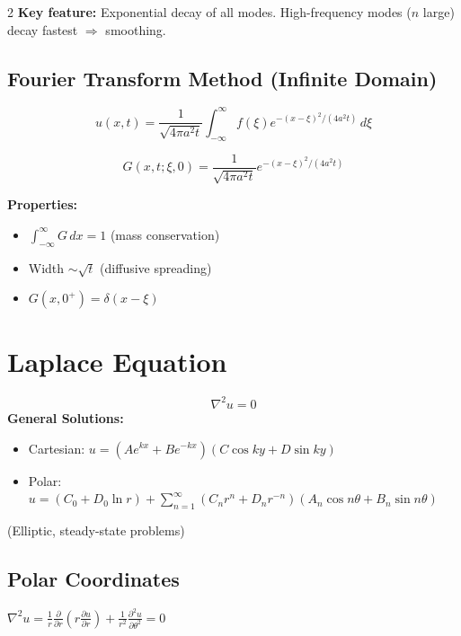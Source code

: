 \documentclass[10pt,a4paper]{article}
\begin{document}
\begin{multicols}{2}
\textbf{Key feature:} Exponential decay of all modes. High-frequency modes ($n$ large) decay fastest $\Rightarrow$ smoothing.

\subsection{Fourier Transform Method (Infinite Domain)}
\begin{equation}
u(x,t) = \frac{1}{\sqrt{4\pi a^2 t}}\int_{-\infty}^{\infty} f(\xi)e^{-(x-\xi)^2/(4a^2 t)}\,d\xi
\end{equation}

\begin{keyformula}
\begin{equation}
G(x,t;\xi,0) = \frac{1}{\sqrt{4\pi a^2 t}}e^{-(x-\xi)^2/(4a^2 t)}
\end{equation}
\end{keyformula}

\textbf{Properties:}
\begin{itemize}
    \item $\int_{-\infty}^{\infty} G\,dx = 1$ (mass conservation)
    \item Width $\sim \sqrt{t}$ (diffusive spreading)
    \item $G(x,0^+) = \delta(x-\xi)$
\end{itemize}

\section{Laplace Equation}

\begin{keyformula}
\begin{equation}
\nabla^2 u = 0
\end{equation}
\textbf{General Solutions:}
\begin{itemize}
\item Cartesian: $u = (Ae^{kx}+Be^{-kx})(C\cos ky + D\sin ky)$
\item Polar: $u = (C_0 + D_0\ln r) + \sum_{n=1}^{\infty}(C_n r^n + D_n r^{-n})(A_n\cos n\theta + B_n\sin n\theta)$
\end{itemize}
(Elliptic, steady-state problems)
\end{keyformula}

\subsection{Polar Coordinates}
$\displaystyle\nabla^2 u = \frac{1}{r}\frac{\partial}{\partial r}\left(r\frac{\partial u}{\partial r}\right) + \frac{1}{r^2}\frac{\partial^2 u}{\partial \theta^2} = 0$


\end{multicols}
\end{document}
